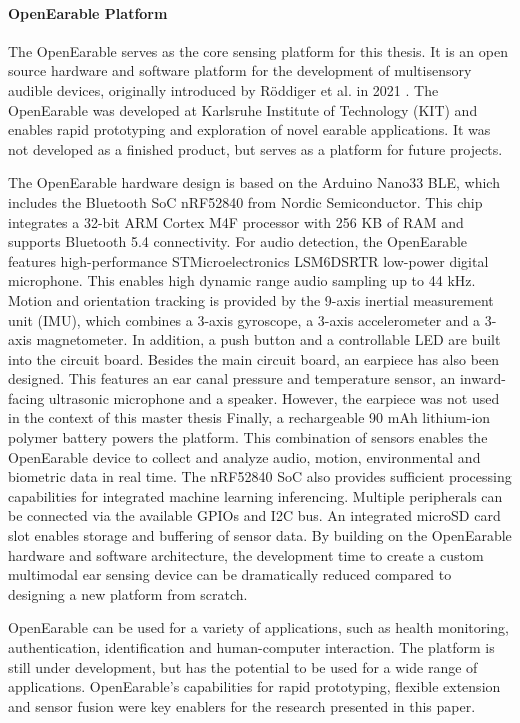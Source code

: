 \paragraph{OpenEarable Platform}
\label{Background:SensingWithEarables:OpenEarable}
The OpenEarable serves as the core sensing platform for this thesis. 
It is an open source hardware and software platform for the development of multisensory audible devices, originally introduced by Röddiger et al. in 2021 \cite{roddigerOpenEarableOpenHardware2022}. 
The OpenEarable was developed at Karlsruhe Institute of Technology (KIT) and enables rapid prototyping and exploration of novel earable applications. 
It was not developed as a finished product, but serves as a platform for future projects.

The OpenEarable hardware design is based on the Arduino Nano33 BLE, which includes the Bluetooth SoC nRF52840 from Nordic Semiconductor.
This chip integrates a 32-bit ARM Cortex M4F processor with 256 KB of RAM and supports Bluetooth 5.4 connectivity. 
For audio detection, the OpenEarable features high-performance STMicroelectronics LSM6DSRTR low-power digital microphone. 
This enables high dynamic range audio sampling up to 44 kHz. 
Motion and orientation tracking is provided by the 9-axis inertial measurement unit (IMU), which combines a 3-axis gyroscope, a 3-axis accelerometer and a 3-axis magnetometer. 
In addition, a push button and a controllable LED are built into the circuit board.
Besides the main circuit board, an earpiece has also been designed. 
This features an ear canal pressure and temperature sensor, an inward-facing ultrasonic microphone and a speaker.
However, the earpiece was not used in the context of this master thesis
Finally, a rechargeable 90 mAh lithium-ion polymer battery powers the platform.
This combination of sensors enables the OpenEarable device to collect and analyze audio, motion, environmental and biometric data in real time. The nRF52840 SoC also provides sufficient processing capabilities for integrated machine learning inferencing. 
Multiple peripherals can be connected via the available GPIOs and I2C bus. 
An integrated microSD card slot enables storage and buffering of sensor data.
By building on the OpenEarable hardware and software architecture, the development time to create a custom multimodal ear sensing device can be dramatically reduced compared to designing a new platform from scratch. 

OpenEarable can be used for a variety of applications, such as health monitoring, authentication, identification and human-computer interaction.
The platform is still under development, but has the potential to be used for a wide range of applications. 
OpenEarable's capabilities for rapid prototyping, flexible extension and sensor fusion were key enablers for the research presented in this paper.

